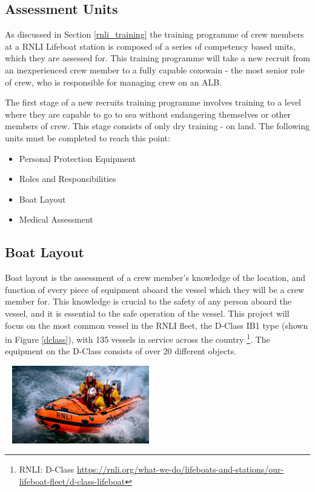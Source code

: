\documentclass[ %
                    author={Elis Jones},
                supervisor={Dr. Kirsten Cater},
                    degree={BSc},
                     title={The Effect of Presentation Medium on Spatial Cognition},
                  subtitle={in the Virtual Environment},
                      year={2018} ]{dissertation}
\begin{document}
\subsection{Assessment Units}
As discussed in Section \ref{rnli_training} the training programme of crew members at a RNLI Lifeboat station is composed of a series of competency based units, which they are assessed for. This training programme will take a new recruit from an inexperienced crew member to a fully capable coxswain - the most senior role of crew, who is responsible for managing crew on an ALB. 

The first stage of a new recruits training programme involves training to a level where they are capable to go to sea without endangering themselves or other members of crew. This stage consists of only dry training - on land. The following units must be completed to reach this point:

\begin{itemize}
    \item Personal Protection Equipment
    \item Roles and Responsibilities
    \item Boat Layout
    \item Medical Assessment
\end{itemize}

\subsection{Boat Layout}
Boat layout is the assessment of a crew member's knowledge of the location, and function of every piece of equipment aboard the vessel which they will be a crew member for. This knowledge is crucial to the safety of any person aboard the vessel, and it is essential to the safe operation of the vessel. This project will focus on the most common vessel in the RNLI fleet, the D-Class IB1 type (shown in Figure \ref{dclass}), with 135 vessels in service across the country \footnote{RNLI: D-Class \url{https://rnli.org/what-we-do/lifeboats-and-stations/our-lifeboat-fleet/d-class-lifeboat}}. The equipment on the D-Class consists of over 20 different objects. 

\begin{minipage}{\textwidth}\
\hfill \break
\centering
\includegraphics[width=0.45\textwidth]{images/d-class}
\label{dclass}
\hfill \break
\end{minipage}
\end{document}
